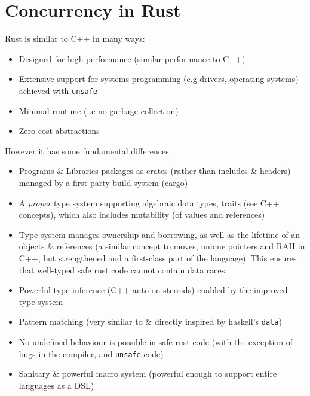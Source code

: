\chapter{Concurrency in Rust}

Rust is similar to C++ in many ways:
\begin{itemize}
    \item Designed for high performance (similar performance to C++)
    \item Extensive support for systems programming (e.g drivers, operating systems) achieved with \texttt{unsafe}
    \item Minimal runtime (i.e no garbage collection)
    \item Zero cost abstractions
\end{itemize}
However it has some fundamental differences
\begin{itemize}
    \item Programs \& Libraries packages as crates (rather than includes \& headers) managed by a first-party build system (cargo)
    \item A \textit{proper} type system supporting algebraic data types, traits (see C++ concepts), which also includes mutability (of values and references)
    \item Type system manages ownership and borrowing, as well as the lifetime of an objects \& references (a similar concept to moves, unique pointers and RAII in C++, but strengthened and a first-class part of the language). This ensures that well-typed safe rust code cannot contain data races.
    \item Powerful type inference (C++ auto on steroids) enabled by the improved type system
    \item Pattern matching (very similar to \& directly inspired by haskell's \texttt{data})
    \item No undefined behaviour is possible in safe rust code (with the exception of bugs in the compiler, and \href{https://doc.rust-lang.org/reference/behavior-considered-undefined.html}{\texttt{unsafe} code})
    \item Sanitary \& powerful macro system (powerful enough to support entire languages as a DSL)
\end{itemize}


